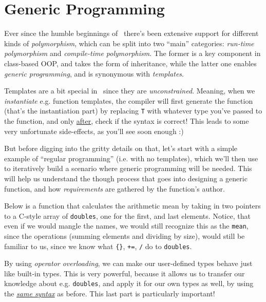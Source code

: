 \section{Generic Programming} \label{sec:generic_programming}

Ever since the humble beginnings of \Cpp\ there's been extensive support for different kinds of \emph{polymorphism}, which can be split into two ``main'' categories: \emph{run-time polymorphism} and \emph{compile-time polymorphism}. The former is a key component in class-based OOP, and takes the form of inheritance, while the latter one enables \emph{generic programming}, and is synonymous with \emph{templates}.

Templates are a bit special in \Cpp\ since they are \emph{unconstrained}. Meaning, when we \emph{instantiate} e.g. function templates, the compiler will first generate the function (that's the instantiation part) by replacing \texttt{T} with whatever type you've passed to the function, and only \underline{after}, check if the syntax is correct! This leads to some very unfortunate side-effects, as you'll see soon enough :)

But before digging into the gritty details on that, let's start with a simple example of ``regular programming'' (i.e. with no templates), which we'll then use to iteratively build a scenario where generic programming will be needed. This will help us understand the though process that goes into designing a generic function, and how \emph{requirements} are gathered by the function's author.

Below is a function that calculates the arithmetic mean by taking in two pointers to a C-style array of \texttt{doubles}, one for the first, and last elements. Notice, that even if we would mangle the names, we would still recognize this as the \texttt{mean}, since the operations (summing elements and dividing by size), would still be familiar to us, since we know what \texttt{\{\}}, \texttt{+=}, \texttt{/} do to \texttt{doubles}.



\noindent By using \emph{operator overloading}, we can make our user-defined types behave just like built-in types. This is very powerful, because it allows us to transfer our knowledge about e.g. \texttt{doubles}, and apply it for our own types as well, by using the \underline{\emph{same syntax}} as before. This last part is particularly important!




